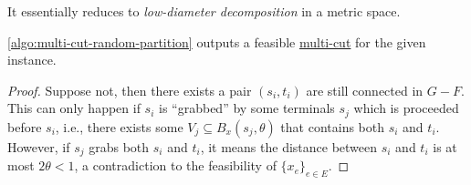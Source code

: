 \begin{intuition}
	It essentially reduces to \emph{low-diameter decomposition} in a metric space.
\end{intuition}

\begin{lemma}\label{lma:multi-cut-random-partition-feasible}
	\autoref{algo:multi-cut-random-partition} outputs a feasible \hyperref[prb:multi-min-cut]{multi-cut} for the given instance.
\end{lemma}
\begin{proof}
	Suppose not, then there exists a pair \((s_i, t_i)\) are still connected in \(G - F\). This can only happen if \(s_i\) is ``grabbed'' by some terminals \(s_j\) which is proceeded before \(s_i\), i.e., there exists some \(V_j \subseteq B_x(s_j, \theta )\) that contains both \(s_i\) and \(t_i\). However, if \(s_j\) grabs both \(s_i\) and \(t_i\), it means the distance between \(s_i\) and \(t_i\) is at most \(2 \theta < 1\), a contradiction to the feasibility of \(\{ x_e \} _{e \in E}\).
\end{proof}

